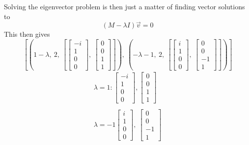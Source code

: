 \documentclass[]{article}
\begin{document}
Solving the eigenvector problem is then just a matter of finding vector
solutions to \[
(M-\lambda I)\vec{v}=0
\] This then gives \[
\left[ \left( 1 - \lambda, \ 2, \ \left[ \left[\begin{matrix}- i\\1\\0\\0\end{matrix}\right], \ \left[\begin{matrix}0\\0\\1\\1\end{matrix}\right]\right]\right), \ \left( - \lambda - 1, \ 2, \ \left[ \left[\begin{matrix}i\\1\\0\\0\end{matrix}\right], \ \left[\begin{matrix}0\\0\\-1\\1\end{matrix}\right]\right]\right)\right]
\] \[
\begin{align}
\lambda=1:\begin{bmatrix}- i\\1\\0\\0\end{bmatrix},\begin{bmatrix}0\\0\\1\\1\end{bmatrix} \\ \\
\lambda=-1\begin{bmatrix}i\\1\\0\\0\end{bmatrix}, \ \begin{bmatrix}0\\0\\-1\\1\end{bmatrix}
\end{align}
\]
\end{document}
